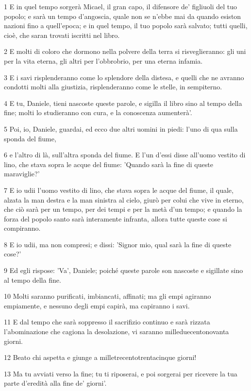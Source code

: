 \par 1 E in quel tempo sorgerà Micael, il gran capo, il difensore de' figliuoli del tuo popolo; e sarà un tempo d'angoscia, quale non se n'ebbe mai da quando esiston nazioni fino a quell'epoca; e in quel tempo, il tuo popolo sarà salvato; tutti quelli, cioè, che saran trovati iscritti nel libro.
\par 2 E molti di coloro che dormono nella polvere della terra si risveglieranno: gli uni per la vita eterna, gli altri per l'obbrobrio, per una eterna infamia.
\par 3 E i savi risplenderanno come lo splendore della distesa, e quelli che ne avranno condotti molti alla giustizia, risplenderanno come le stelle, in sempiterno.
\par 4 E tu, Daniele, tieni nascoste queste parole, e sigilla il libro sino al tempo della fine; molti lo studieranno con cura, e la conoscenza aumenterà'.
\par 5 Poi, io, Daniele, guardai, ed ecco due altri uomini in piedi: l'uno di qua sulla sponda del fiume,
\par 6 e l'altro di là, sull'altra sponda del fiume. E l'un d'essi disse all'uomo vestito di lino, che stava sopra le acque del fiume: 'Quando sarà la fine di queste maraviglie?'
\par 7 E io udii l'uomo vestito di lino, che stava sopra le acque del fiume, il quale, alzata la man destra e la man sinistra al cielo, giurò per colui che vive in eterno, che ciò sarà per un tempo, per dei tempi e per la metà d'un tempo; e quando la forza del popolo santo sarà interamente infranta, allora tutte queste cose si compiranno.
\par 8 E io udii, ma non compresi; e dissi: 'Signor mio, qual sarà la fine di queste cose?'
\par 9 Ed egli rispose: 'Va', Daniele; poiché queste parole son nascoste e sigillate sino al tempo della fine.
\par 10 Molti saranno purificati, imbiancati, affinati; ma gli empi agiranno empiamente, e nessuno degli empi capirà, ma capiranno i savi.
\par 11 E dal tempo che sarà soppresso il sacrifizio continuo e sarà rizzata l'abominazione che cagiona la desolazione, vi saranno milleduecentonovanta giorni.
\par 12 Beato chi aspetta e giunge a milletrecentotrentacinque giorni!
\par 13 Ma tu avviati verso la fine; tu ti riposerai, e poi sorgerai per ricevere la tua parte d'eredità alla fine de' giorni'.


